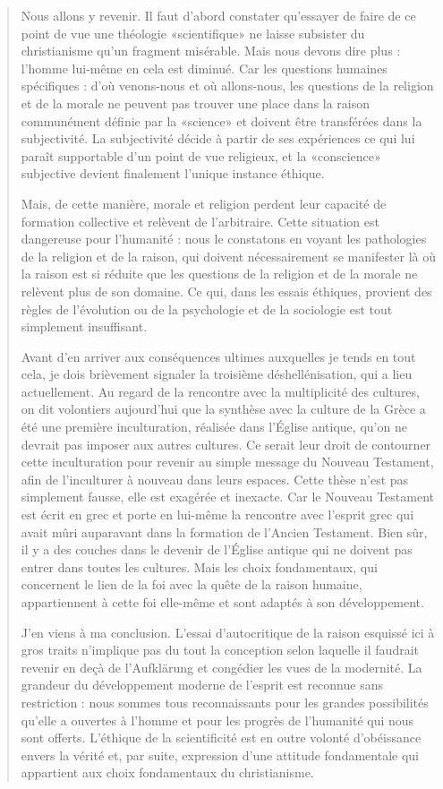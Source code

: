 \begin{quote}
Nous allons y revenir. Il faut d'abord constater qu'essayer de faire de ce point de vue une théologie «scientifique» ne laisse subsister du christianisme qu'un fragment misérable. Mais nous devons dire plus : l'homme lui-même en cela est diminué. Car les questions humaines spécifiques : d'où venons-nous et où allons-nous, les questions de la religion et de la morale ne peuvent pas trouver une place dans la raison communément définie par la «science» et doivent être transférées dans la subjectivité. La subjectivité décide à partir de ses expériences ce qui lui paraît supportable d'un point de vue religieux, et la «conscience» subjective devient finalement l'unique instance éthique.

Mais, de cette manière, morale et religion perdent leur capacité de formation collective et relèvent de l'arbitraire. Cette situation est dangereuse pour l'humanité : nous le constatons en voyant les pathologies de la religion et de la raison, qui doivent nécessairement se manifester là où la raison est si réduite que les questions de la religion et de la morale ne relèvent plus de son domaine. Ce qui, dans les essais éthiques, provient des règles de l'évolution ou de la psychologie et de la sociologie est tout simplement insuffisant.

Avant d'en arriver aux conséquences ultimes auxquelles je tends en tout cela, je dois brièvement signaler la troisième déshellénisation, qui a lieu actuellement. Au regard de la rencontre avec la multiplicité des cultures, on dit volontiers aujourd'hui que la synthèse avec la culture de la Grèce a été une première inculturation, réalisée dans l'Église antique, qu'on ne devrait pas imposer aux autres cultures. Ce serait leur droit de contourner cette inculturation pour revenir au simple message du Nouveau Testament, afin de l'inculturer à nouveau dans leurs espaces. Cette thèse n'est pas simplement fausse, elle est exagérée et inexacte. Car le Nouveau Testament est écrit en grec et porte en lui-même la rencontre avec l'esprit grec qui avait mûri auparavant dans la formation de l'Ancien Testament. Bien sûr, il y a des couches dans le devenir de l'Église antique qui ne doivent pas entrer dans toutes les cultures. Mais les choix fondamentaux, qui concernent le lien de la foi avec la quête de la raison humaine, appartiennent à cette foi elle-même et sont adaptés à son développement.

J'en viens à ma conclusion. L'essai d'autocritique de la raison esquissé ici à gros traits n'implique pas du tout la conception selon laquelle il faudrait revenir en deçà de l'Aufklärung et congédier les vues de la modernité. La grandeur du développement moderne de l'esprit est reconnue sans restriction : nous sommes tous reconnaissants pour les grandes possibilités qu'elle a ouvertes à l'homme et pour les progrès de l'humanité qui nous sont offerts. L'éthique de la scientificité est en outre volonté d'obéissance envers la vérité et, par suite, expression d'une attitude fondamentale qui appartient aux choix fondamentaux du christianisme.


\end{quote}
